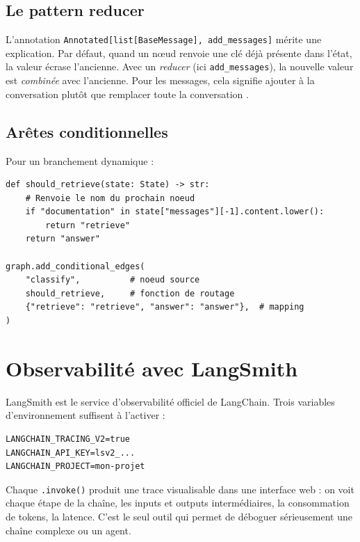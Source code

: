 \documentclass[11pt,a4paper]{article}
\begin{document}
\subsection{Le pattern reducer}

L'annotation \texttt{Annotated[list[BaseMessage], add\_messages]} mérite une explication. Par défaut, quand un n{\oe}ud renvoie une clé déjà présente dans l'état, la valeur écrase l'ancienne. Avec un \emph{reducer} (ici \texttt{add\_messages}), la nouvelle valeur est \emph{combinée} avec l'ancienne. Pour les messages, cela signifie \og ajouter à la conversation \fg{} plutôt que \og remplacer toute la conversation \fg.

\subsection{Arêtes conditionnelles}

Pour un branchement dynamique :

\begin{verbatim}
def should_retrieve(state: State) -> str:
    # Renvoie le nom du prochain noeud
    if "documentation" in state["messages"][-1].content.lower():
        return "retrieve"
    return "answer"

graph.add_conditional_edges(
    "classify",          # noeud source
    should_retrieve,     # fonction de routage
    {"retrieve": "retrieve", "answer": "answer"},  # mapping
)
\end{verbatim}

\section{Observabilité avec LangSmith}

LangSmith est le service d'observabilité officiel de LangChain. Trois variables d'environnement suffisent à l'activer :

\begin{verbatim}
LANGCHAIN_TRACING_V2=true
LANGCHAIN_API_KEY=lsv2_...
LANGCHAIN_PROJECT=mon-projet
\end{verbatim}

Chaque \texttt{.invoke()} produit une trace visualisable dans une interface web : on voit chaque étape de la chaîne, les inputs et outputs intermédiaires, la consommation de tokens, la latence. C'est le seul outil qui permet de déboguer sérieusement une chaîne complexe ou un agent.
\end{document}
